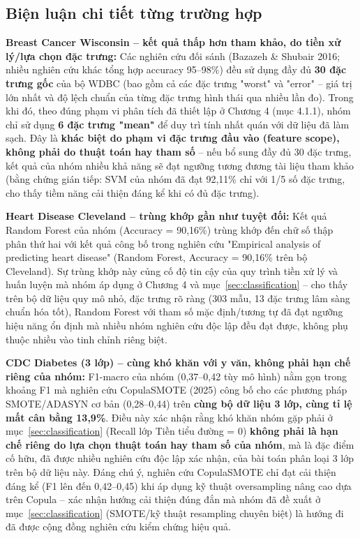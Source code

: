 \subsection{Biện luận chi tiết từng trường hợp}

\textbf{Breast Cancer Wisconsin -- kết quả thấp hơn tham khảo, do tiền xử lý/lựa chọn đặc trưng:} Các nghiên cứu đối sánh (Bazazeh \& Shubair 2016; nhiều nghiên cứu khác tổng hợp accuracy 95--98\%) đều sử dụng đầy đủ \textbf{30 đặc trưng gốc} của bộ WDBC (bao gồm cả các đặc trưng "worst" và "error" -- giá trị lớn nhất và độ lệch chuẩn của từng đặc trưng hình thái qua nhiều lần đo). Trong khi đó, theo đúng phạm vi phân tích đã thiết lập ở Chương 4 (mục 4.1.1), nhóm chỉ sử dụng \textbf{6 đặc trưng "mean"} để duy trì tính nhất quán với dữ liệu đã làm sạch. Đây là \textbf{khác biệt do phạm vi đặc trưng đầu vào (feature scope), không phải do thuật toán hay tham số} -- nếu bổ sung đầy đủ 30 đặc trưng, kết quả của nhóm nhiều khả năng sẽ đạt ngưỡng tương đương tài liệu tham khảo (bằng chứng gián tiếp: SVM của nhóm đã đạt 92,11\% chỉ với 1/5 số đặc trưng, cho thấy tiềm năng cải thiện đáng kể khi có đủ đặc trưng).

\textbf{Heart Disease Cleveland -- trùng khớp gần như tuyệt đối:} Kết quả Random Forest của nhóm (Accuracy = 90,16\%) trùng khớp đến chữ số thập phân thứ hai với kết quả công bố trong nghiên cứu "Empirical analysis of predicting heart disease" (Random Forest, Accuracy = 90,16\% trên bộ Cleveland). Sự trùng khớp này củng cố độ tin cậy của quy trình tiền xử lý và huấn luyện mà nhóm áp dụng ở Chương 4 và mục~\ref{sec:classification} -- cho thấy trên bộ dữ liệu quy mô nhỏ, đặc trưng rõ ràng (303 mẫu, 13 đặc trưng lâm sàng chuẩn hóa tốt), Random Forest với tham số mặc định/tương tự đã đạt ngưỡng hiệu năng ổn định mà nhiều nhóm nghiên cứu độc lập đều đạt được, không phụ thuộc nhiều vào tinh chỉnh riêng biệt.

\textbf{CDC Diabetes (3 lớp) -- cùng khó khăn với y văn, không phải hạn chế riêng của nhóm:} F1-macro của nhóm (0,37--0,42 tùy mô hình) nằm gọn trong khoảng F1 mà nghiên cứu CopulaSMOTE (2025) công bố cho các phương pháp SMOTE/ADASYN cơ bản (0,28--0,44) trên \textbf{cùng bộ dữ liệu 3 lớp, cùng tỉ lệ mất cân bằng 13,9\%}. Điều này xác nhận rằng khó khăn nhóm gặp phải ở mục~\ref{sec:classification} (Recall lớp Tiền tiểu đường = 0) \textbf{không phải là hạn chế riêng do lựa chọn thuật toán hay tham số của nhóm}, mà là đặc điểm cố hữu, đã được nhiều nghiên cứu độc lập xác nhận, của bài toán phân loại 3 lớp trên bộ dữ liệu này. Đáng chú ý, nghiên cứu CopulaSMOTE chỉ đạt cải thiện đáng kể (F1 lên đến 0,42--0,45) khi áp dụng kỹ thuật oversampling nâng cao dựa trên Copula -- xác nhận hướng cải thiện đúng đắn mà nhóm đã đề xuất ở mục~\ref{sec:classification} (SMOTE/kỹ thuật resampling chuyên biệt) là hướng đi đã được cộng đồng nghiên cứu kiểm chứng hiệu quả.

